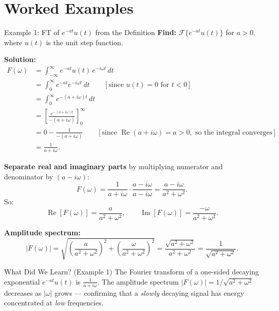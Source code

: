 \documentclass[12pt,a4paper]{article}
\begin{document}
\section{Worked Examples}

\begin{infobox}{Example 1: FT of $e^{-at}u(t)$ from the Definition}
\textbf{Find:} $\mathcal{F}\{e^{-at}u(t)\}$ for $a > 0$, where $u(t)$ is the unit step function.

\textbf{Solution:}
\begin{align*}
F(\omega)
  &= \int_{-\infty}^{\infty} e^{-at}u(t)\,e^{-i\omega t}\,dt \\
  &= \int_{0}^{\infty} e^{-at} e^{-i\omega t}\,dt
     \qquad [\text{since } u(t)=0 \text{ for } t<0] \\
  &= \int_{0}^{\infty} e^{-(a+i\omega)t}\,dt \\
  &= \left[\frac{e^{-(a+i\omega)t}}{-(a+i\omega)}\right]_0^\infty \\
  &= 0 - \frac{1}{-(a+i\omega)}
     \qquad [\text{since } \operatorname{Re}(a+i\omega)=a>0, \text{ so the integral converges}] \\
  &= \frac{1}{a+i\omega}.
\end{align*}

\textbf{Separate real and imaginary parts} by multiplying numerator and denominator by $(a - i\omega)$:
\[
  F(\omega) = \frac{1}{a+i\omega}\cdot\frac{a-i\omega}{a-i\omega}
            = \frac{a - i\omega}{a^2+\omega^2}.
\]
So:
\[
  \operatorname{Re}[F(\omega)] = \frac{a}{a^2+\omega^2}, \qquad
  \operatorname{Im}[F(\omega)] = \frac{-\omega}{a^2+\omega^2}.
\]

\textbf{Amplitude spectrum:}
\[
  |F(\omega)| = \sqrt{\left(\frac{a}{a^2+\omega^2}\right)^2 + \left(\frac{\omega}{a^2+\omega^2}\right)^2}
              = \frac{\sqrt{a^2+\omega^2}}{a^2+\omega^2}
              = \frac{1}{\sqrt{a^2+\omega^2}}.
\]
\end{infobox}

\begin{learnbox}{What Did We Learn? (Example 1)}
The Fourier transform of a one-sided decaying exponential $e^{-at}u(t)$ is $\frac{1}{a+i\omega}$.
The amplitude spectrum $|F(\omega)| = 1/\sqrt{a^2+\omega^2}$ decreases as $|\omega|$ grows ---
confirming that a \emph{slowly} decaying signal has energy concentrated at \emph{low} frequencies.
\end{learnbox}
\end{document}
